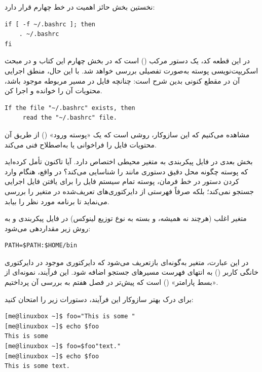 نخستین بخش حائز اهمیت در خط چهارم قرار دارد:

\begin{latin}
\begin{lstlisting}
if [ -f ~/.bashrc ]; then
    . ~/.bashrc
fi
\end{lstlisting}
\end{latin}

در این قطعه کد،  یک دستور مرکب () است که در بخش چهارم این کتاب و در مبحث اسکریپت‌نویسی پوسته به‌صورت تفصیلی بررسی خواهد شد. با این حال، منطق اجرایی آن در مقطع کنونی بدین شرح است: چنانچه فایل  در مسیر مربوطه موجود باشد، محتویات آن را خوانده و اجرا کن.

\begin{latin}
\begin{lstlisting}
If the file "~/.bashrc" exists, then
     read the "~/.bashrc" file.
\end{lstlisting}
\end{latin}

مشاهده می‌کنیم که این سازوکار، روشی است که یک «پوسته ورود» () از طریق آن محتویات فایل  را فراخوانی یا به‌اصطلاح فنی  می‌کند.

بخش بعدی در فایل پیکربندی به متغیر محیطی  اختصاص دارد. آیا تاکنون تأمل کرده‌اید که پوسته چگونه محل دقیق دستوری مانند  را شناسایی می‌کند؟ در واقع، هنگام وارد کردن دستور  در خط فرمان، پوسته تمام سیستم فایل را برای یافتن فایل اجرایی جستجو نمی‌کند؛ بلکه صرفاً فهرستی از دایرکتوری‌های تعریف‌شده در متغیر  را بررسی می‌نماید تا برنامه مورد نظر را بیابد.

متغیر  اغلب (هرچند نه همیشه، و بسته به نوع توزیع لینوکس) در فایل پیکربندی  و به روش زیر مقداردهی می‌شود:

\begin{latin}
\begin{lstlisting}
PATH=$PATH:$HOME/bin
\end{lstlisting}
\end{latin}

در این عبارت، متغیر  به‌گونه‌ای بازتعریف می‌شود که دایرکتوری  موجود در دایرکتوری خانگی کاربر () به انتهای فهرست مسیرهای جستجو اضافه شود. این فرآیند، نمونه‌ای از «بسط پارامتر» () است که پیش‌تر در فصل هفتم به بررسی آن پرداختیم.

برای درک بهتر سازوکار این فرآیند، دستورات زیر را امتحان کنید:

\begin{latin}
\begin{lstlisting}
[me@linuxbox ~]$ foo="This is some "
[me@linuxbox ~]$ echo $foo
This is some
[me@linuxbox ~]$ foo=$foo"text."
[me@linuxbox ~]$ echo $foo
This is some text.
\end{lstlisting}
\end{latin}

